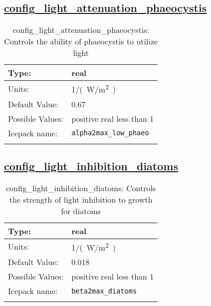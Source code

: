 \subsection[config\_light\_attenuation\_phaeocystis]{\hyperref[sec:nm_tab_biogeochemistry]{config\_light\_attenuation\_phaeocystis}}
\label{subsec:nm_sec_config_light_attenuation_phaeocystis}
\begin{center}
\begin{longtable}{| p{2.0in} || p{4.0in} |}
    \hline
    Type: & real \\
    \hline
    Units: & \si{1/(W/m^2)} \\
    \hline
    Default Value: & 0.67 \\
    \hline
    Possible Values: & positive real less than 1 \\
    \hline
    Icepack name: & \verb+alpha2max_low_phaeo+ \\
    \hline
    \caption{config\_light\_attenuation\_phaeocystis: Controls the ability of phaeocystis to utilize light}
\end{longtable}
\end{center}
\subsection[config\_light\_inhibition\_diatoms]{\hyperref[sec:nm_tab_biogeochemistry]{config\_light\_inhibition\_diatoms}}
\label{subsec:nm_sec_config_light_inhibition_diatoms}
\begin{center}
\begin{longtable}{| p{2.0in} || p{4.0in} |}
    \hline
    Type: & real \\
    \hline
    Units: & \si{1/(W/m^2)} \\
    \hline
    Default Value: & 0.018 \\
    \hline
    Possible Values: & positive real less than 1 \\
    \hline
    Icepack name: & \verb+beta2max_diatoms+ \\
    \hline
    \caption{config\_light\_inhibition\_diatoms: Controls the strength of light inhibition to growth for diatoms}
\end{longtable}
\end{center}
